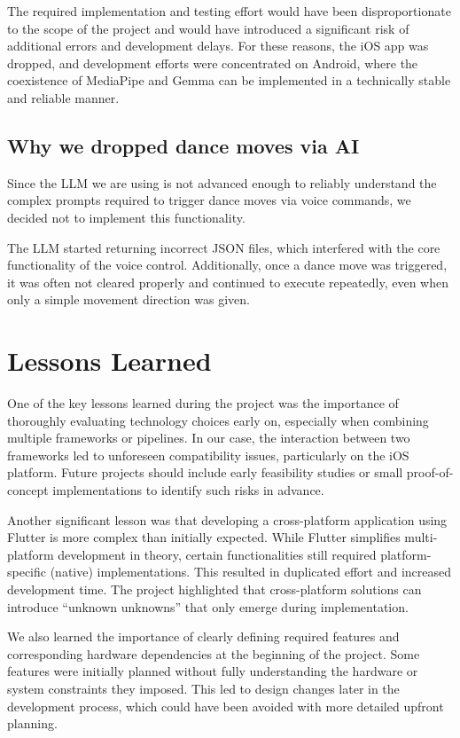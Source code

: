 \documentclass[11pt,a4paper]{article}
\begin{document}
The required implementation and testing effort would have been disproportionate to the scope of the project and
would have introduced a significant risk of additional errors and development delays. For these reasons, the iOS app was dropped,
and development efforts were concentrated on Android, where the coexistence of MediaPipe and
Gemma can be implemented in a technically stable and reliable manner.

\subsection{Why we dropped dance moves via AI}

Since the LLM we are using is not advanced enough to reliably understand the complex prompts required to trigger dance moves via voice commands,
we decided not to implement this functionality.

The LLM started returning incorrect JSON files, which interfered with the core functionality of the voice control. Additionally, once a dance move was triggered,
it was often not cleared properly and continued to execute repeatedly, even when only a simple movement direction was given.

\section{Lessons Learned}

One of the key lessons learned during the project was the importance of thoroughly evaluating technology choices early on, especially when combining multiple frameworks or pipelines. In our case, the interaction between two frameworks led to unforeseen compatibility issues, particularly on the iOS platform. Future projects should include early feasibility studies or small proof-of-concept implementations to identify such risks in advance.

Another significant lesson was that developing a cross-platform application using Flutter is more complex than initially expected. While Flutter simplifies multi-platform development in theory, certain functionalities still required platform-specific (native) implementations. This resulted in duplicated effort and increased development time. The project highlighted that cross-platform solutions can introduce “unknown unknowns” that only emerge during implementation.

We also learned the importance of clearly defining required features and corresponding hardware dependencies at the beginning of the project. Some features were initially planned without fully understanding the hardware or system constraints they imposed. This led to design changes later in the development process, which could have been avoided with more detailed upfront planning.
\end{document}
